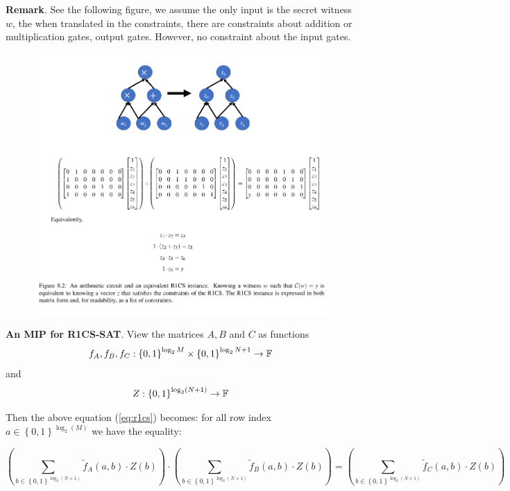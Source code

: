 \documentclass{article}
\begin{document}
\textbf{Remark}. See the following figure, we assume the only input is the secret witness $w$, the when translated in the constraints, there are constraints about addition or multiplication gates, output gates. However, no constraint about the input gates.
\begin{figure}[H]
\centering
\includegraphics[scale=0.5]{R1CS}
\end{figure}

\textbf{An MIP for R1CS-SAT}. View the matrices $A, B$ and $C$ as functions 
\begin{equation*}
f_A, f_B, f_C: \left\{ 0, 1 \right\}^{\log_2 M} \times \left\{ 0, 1 \right\}^{\log_2 N+1} \rightarrow \mathbb{F}
\end{equation*}
and 
\begin{equation*}
Z: \left\{ 0, 1 \right\}^{\log_2(N+1)} \rightarrow \mathbb{F}
\end{equation*}

Then the above equation (\ref{eq:r1cs}) becomes: for all row index $a \in \left\{ 0, 1 \right\}^{\log_2(M)}$ we have the equality: 

\begin{equation} \label{eq:r1cs-2}
\left( \sum_{b \in \left\{ 0, 1 \right\}^{\log_2(N+1)}} \widetilde{f}_A(a, b) \cdot Z(b) \right) \cdot \left( \sum_{b \in \left\{ 0, 1 \right\}^{\log_2(N+1)}} \widetilde{f}_{B}(a, b) \cdot Z(b) \right) = \left( \sum_{b \in \left\{ 0, 1 \right\}^{\log_2(N+1)}} \widetilde{f}_{C}(a, b) \cdot Z(b) \right)
\end{equation}
\end{document}
